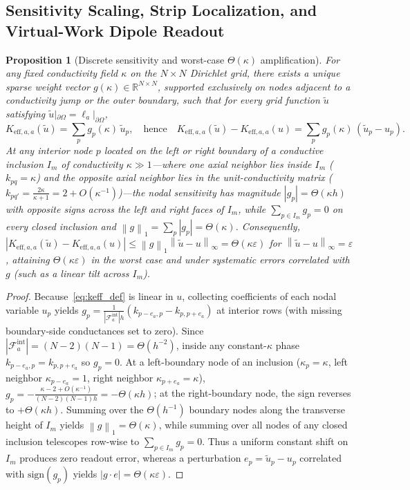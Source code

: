 \documentclass[preprint,11pt]{elsarticle}
\newcommand{\R}{\mathbb{R}}
\newcommand{\Keffij}[1]{K_{\mathrm{eff},#1}}
\newcommand{\norm}[1]{\left\lVert #1 \right\rVert}
\newcommand{\abs}[1]{\left\lvert #1 \right\rvert}
\newtheorem{proposition}{Proposition}
\begin{document}
\subsection{Sensitivity Scaling, Strip Localization, and Virtual-Work Dipole Readout}

\begin{proposition}[Discrete sensitivity and worst-case $\Theta(\kappa)$ amplification]\label{prop:amp}
For any fixed conductivity field $\kappa$ on the $N\times N$ Dirichlet grid, there exists a unique sparse weight vector $g(\kappa) \in \R^{N\times N}$, supported exclusively on nodes adjacent to a conductivity jump or the outer boundary, such that for every grid function $\tilde u$ satisfying $\tilde u|_{\partial\Omega} = \ell_a|_{\partial\Omega}$,
\begin{equation}\label{eq:g_dot_u}
  \Keffij{a,a}(\tilde u) = \sum_{p} g_p(\kappa)\, \tilde u_p,
  \quad\text{hence}\quad
  \Keffij{a,a}(\tilde u) - \Keffij{a,a}(u) = \sum_{p} g_p(\kappa)\, (\tilde u_p - u_p).
\end{equation}
At any interior node $p$ located on the left or right boundary of a conductive inclusion $I_m$ of conductivity $\kappa \gg 1$—where one axial neighbor lies inside $I_m$ ($k_{pq} = \kappa$) and the opposite axial neighbor lies in the unit-conductivity matrix ($k_{pq'} = \frac{2\kappa}{\kappa+1} = 2 + O(\kappa^{-1})$)—the nodal sensitivity has magnitude $\abs{g_p} = \Theta(\kappa h)$ with opposite signs across the left and right faces of $I_m$, while $\sum_{p \in I_m} g_p = 0$ on every closed inclusion and $\norm{g}_1 = \sum_p \abs{g_p} = \Theta(\kappa)$. Consequently, $\abs{\Keffij{a,a}(\tilde u) - \Keffij{a,a}(u)} \le \norm{g}_1 \norm{\tilde u - u}_\infty = \Theta(\kappa \varepsilon)$ for $\norm{\tilde u - u}_\infty = \varepsilon$, attaining $\Theta(\kappa\varepsilon)$ in the worst case and under systematic errors correlated with $g$ (such as a linear tilt across $I_m$).
\end{proposition}

\begin{proof}
Because~\eqref{eq:keff_def} is linear in $u$, collecting coefficients of each nodal variable $u_p$ yields $g_p = \frac{1}{\abs{\mathcal{F}_a^{\mathrm{int}}} h}(k_{p-e_a,p} - k_{p,p+e_a})$ at interior rows (with missing boundary-side conductances set to zero). Since $\abs{\mathcal{F}_a^{\mathrm{int}}} = (N-2)(N-1) = \Theta(h^{-2})$, inside any constant-$\kappa$ phase $k_{p-e_a,p} = k_{p,p+e_a}$ so $g_p = 0$. At a left-boundary node of an inclusion ($\kappa_p = \kappa$, left neighbor $\kappa_{p-e_a}=1$, right neighbor $\kappa_{p+e_a}=\kappa$), $g_p = -\frac{\kappa - 2 + O(\kappa^{-1})}{(N-2)(N-1)h} = -\Theta(\kappa h)$; at the right-boundary node, the sign reverses to $+\Theta(\kappa h)$. Summing over the $\Theta(h^{-1})$ boundary nodes along the transverse height of $I_m$ yields $\norm{g}_1 = \Theta(\kappa)$, while summing over all nodes of any closed inclusion telescopes row-wise to $\sum_{p \in I_m} g_p = 0$. Thus a uniform constant shift on $I_m$ produces zero readout error, whereas a perturbation $e_p = \tilde u_p - u_p$ correlated with $\mathrm{sign}(g_p)$ yields $\abs{g\cdot e} = \Theta(\kappa\varepsilon)$.
\end{proof}
\end{document}
